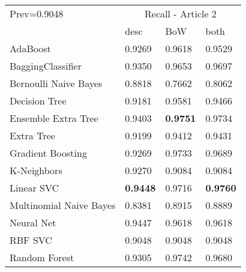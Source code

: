 \begin{tabular}{|l|l|l|l| }
\hline
Prev=0.9048 &  \multicolumn{3}{c|}{Recall - Article 2} \\
\cline{2-4} & desc & BoW & both \\ \hline
AdaBoost                & 0.9269 & 0.9618 & 0.9529\\
BaggingClassifier       & 0.9350 & 0.9653 & 0.9697\\
Bernoulli Naive Bayes   & 0.8818 & 0.7662 & 0.8062\\
Decision Tree           & 0.9181 & 0.9581 & 0.9466\\
Ensemble Extra Tree     & 0.9403 & {\bf 0.9751} & 0.9734\\
Extra Tree              & 0.9199 & 0.9412 & 0.9431\\
Gradient Boosting       & 0.9269 & 0.9733 & 0.9689\\
K-Neighbors             & 0.9270 & 0.9084 & 0.9084\\
Linear SVC              & {\bf 0.9448} & 0.9716 & {\bf 0.9760}\\
Multinomial Naive Bayes & 0.8381 & 0.8915 & 0.8889\\
Neural Net              & 0.9447 & 0.9618 & 0.9618\\
RBF SVC                 & 0.9048 & 0.9048 & 0.9048\\
Random Forest           & 0.9305 & 0.9742 & 0.9680\\
\hline
\end{tabular}